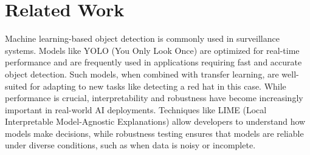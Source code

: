 \section{Related Work}
Machine learning-based object detection is commonly used in surveillance systems.
Models like YOLO (You Only Look Once) are optimized for real-time performance and are frequently used in applications requiring fast and accurate object detection. 
Such models, when combined with transfer learning, are well-suited for adapting to new tasks like detecting a red hat in this case. 
While performance is crucial, interpretability and robustness have become increasingly important in real-world AI deployments. 
Techniques like LIME (Local Interpretable Model-Agnostic Explanations) allow developers to understand how models make decisions, while robustness testing ensures that models are reliable under diverse conditions, such as when data is noisy or incomplete.